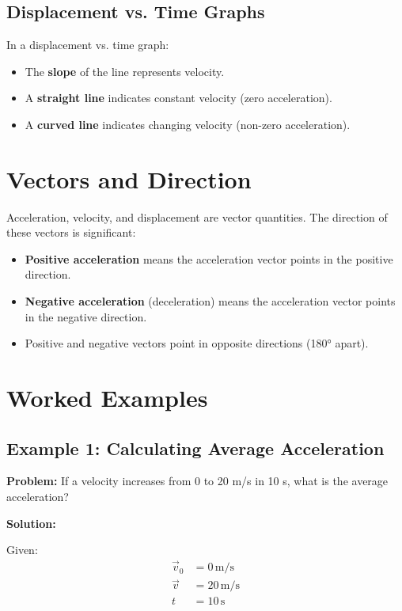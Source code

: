 \documentclass{article}
\begin{document}
\subsection{Displacement vs. Time Graphs}

In a displacement vs. time graph:
\begin{itemize}
    \item The \textbf{slope} of the line represents velocity.
    \item A \textbf{straight line} indicates constant velocity (zero acceleration).
    \item A \textbf{curved line} indicates changing velocity (non-zero acceleration).
\end{itemize}

\section{Vectors and Direction}

Acceleration, velocity, and displacement are vector quantities. The direction of these vectors is significant:

\begin{itemize}
    \item \textbf{Positive acceleration} means the acceleration vector points in the positive direction.
    \item \textbf{Negative acceleration} (deceleration) means the acceleration vector points in the negative direction.
    \item Positive and negative vectors point in opposite directions (180° apart).
\end{itemize}
\newpage
\section{Worked Examples}

\subsection{Example 1: Calculating Average Acceleration}

\textbf{Problem:} If a velocity increases from 0 to 20 m/s in 10 s, what is the average acceleration?

\textbf{Solution:}

Given:
\begin{align*}
\vec{v}_0 &= 0 \, \text{m/s} \\
\vec{v} &= 20 \, \text{m/s} \\
t &= 10 \, \text{s}
\end{align*}
\end{document}
